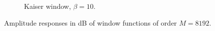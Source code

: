 \begin{figure}[H]
\begin{subfigure}{0.49\textwidth}
\caption{Kaiser window, $\beta=10$.}
\end{subfigure}

\caption{Amplitude responses in dB of window functions of order $M=8192$.}
\label{fig:db_plots_8192}
\end{figure}